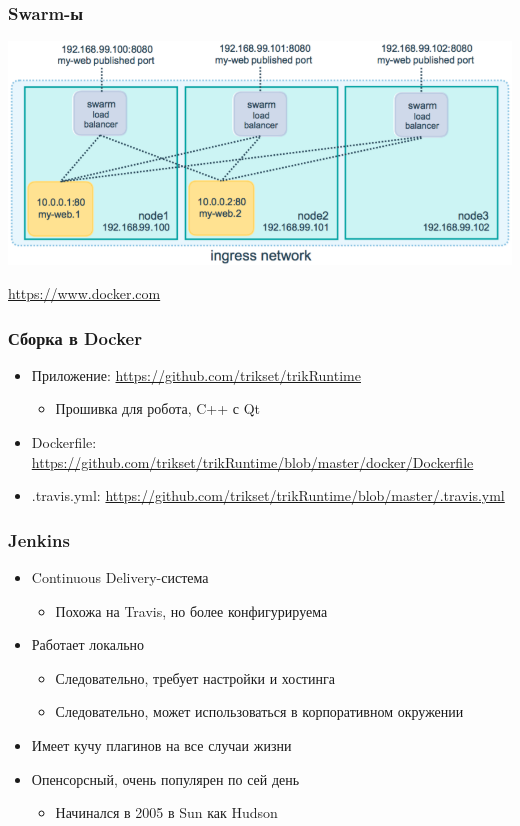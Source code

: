 \documentclass[xetex,mathserif,serif]{beamer}
\newcommand{\attribution}[1] {
	\begin{flushright}\begin{scriptsize}\textcolor{gray}{\textcopyright\; #1}\end{scriptsize}\end{flushright}
}
\begin{document}
	\begin{frame}
		\frametitle{Swarm-ы}
		\begin{center}
			\includegraphics[width=\textwidth]{swarmLoadBalancing.png}
			\attribution{\url{https://www.docker.com}}
		\end{center}
	\end{frame}

	\begin{frame}
		\frametitle{Сборка в Docker}
		\begin{itemize}
			\item Приложение: \url{https://github.com/trikset/trikRuntime}
			\begin{itemize}
				\item Прошивка для робота, C++ с Qt
			\end{itemize}
			\item Dockerfile: \url{https://github.com/trikset/trikRuntime/blob/master/docker/Dockerfile}
			\item .travis.yml: \url{https://github.com/trikset/trikRuntime/blob/master/.travis.yml}
		\end{itemize}
	\end{frame}

	\begin{frame}
		\frametitle{Jenkins}
		\begin{itemize}
			\item Continuous Delivery-система
			\begin{itemize}
				\item Похожа на Travis, но более конфигурируема
			\end{itemize}
			\item Работает локально
			\begin{itemize}
				\item Следовательно, требует настройки и хостинга
				\item Следовательно, может использоваться в корпоративном окружении
			\end{itemize}
			\item Имеет кучу плагинов на все случаи жизни
			\item Опенсорсный, очень популярен по сей день
			\begin{itemize}
				\item Начинался в 2005 в Sun как Hudson
			\end{itemize}
		\end{itemize}
	\end{frame}
\end{document}

